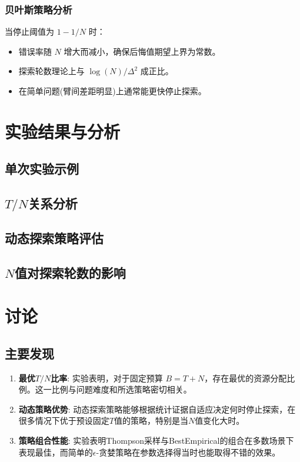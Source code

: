 \documentclass[8pt, a4paper]{ctexart} %
\newcommand{\N}{\ensuremath{N}}
\newcommand{\T}{\ensuremath{T}}
\newcommand{\eps}{\ensuremath{\epsilon}} %
\newcommand{\DeltaVal}{\ensuremath{\Delta}}
\begin{document}
\subsubsection{贝叶斯策略分析}
当停止阈值为 $1-1/\N$ 时：
\begin{itemize}
    \item 错误率随 $\N$ 增大而减小，确保后悔值期望上界为常数。
    \item 探索轮数理论上与 $\log(\N)/\DeltaVal^2$ 成正比。
    \item 在简单问题(臂间差距明显)上通常能更快停止探索。
\end{itemize}

\section{实验结果与分析}

\subsection{单次实验示例}


\subsection{$\T/\N$关系分析}


\subsection{动态探索策略评估}


\subsection{$\N$值对探索轮数的影响}


\section{讨论}

\subsection{主要发现}
\begin{enumerate}
    \item \textbf{最优$\T/\N$比率}: 实验表明，对于固定预算 $B=\T+\N$，存在最优的资源分配比例。这一比例与问题难度和所选策略密切相关。
    \item \textbf{动态策略优势}: 动态探索策略能够根据统计证据自适应决定何时停止探索，在很多情况下优于预设固定$\T$值的策略，特别是当$\N$值变化大时。
    \item \textbf{策略组合性能}: 实验表明Thompson采样与BestEmpirical的组合在多数场景下表现最佳，而简单的$\eps$-贪婪策略在参数选择得当时也能取得不错的效果。
\end{enumerate}
\end{document}
